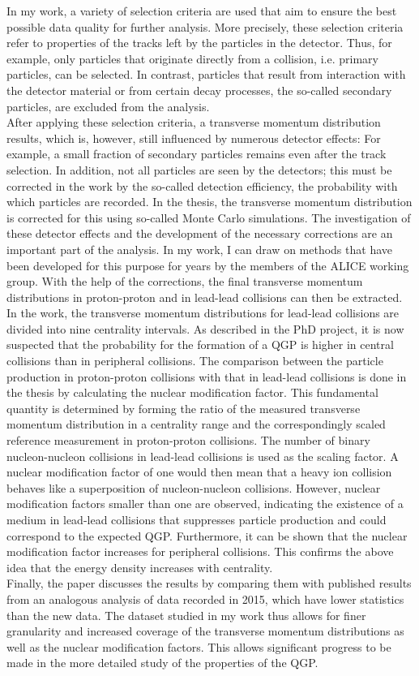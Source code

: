 \documentclass[12pt,a4paper]{report}
\begin{document}
In my work, a variety of selection criteria are used that aim to ensure the best possible data quality for further analysis. More precisely, these selection criteria refer to properties of the tracks left by the particles in the detector. Thus, for example, only particles that originate directly from a collision, i.e. primary particles, can be selected. In contrast, particles that result from interaction with the detector material or from certain decay processes, the so-called secondary particles, are excluded from the analysis.\\
After applying these selection criteria, a transverse momentum distribution results, which is, however, still influenced by numerous detector effects: For example, a small fraction of secondary particles remains even after the track selection. In addition, not all particles are seen by the detectors; this must be corrected in the work by the so-called detection efficiency, the probability with which particles are recorded. In the thesis, the transverse momentum distribution is corrected for this using so-called Monte Carlo simulations. The investigation of these detector effects and the development of the necessary corrections are an important part of the analysis. In my work, I can draw on methods that have been developed for this purpose for years by the members of the ALICE working group. With the help of the corrections, the final transverse momentum distributions in proton-proton and in lead-lead collisions can then be extracted. In the work, the transverse momentum distributions for lead-lead collisions are divided into nine centrality intervals. As described in the PhD project, it is now suspected that the probability for the formation of a QGP is higher in central collisions than in peripheral collisions. 
The comparison between the particle production in proton-proton collisions with that in lead-lead collisions is done in the thesis by calculating the nuclear modification factor. This fundamental quantity is determined by forming the ratio of the measured transverse momentum distribution in a centrality range and the correspondingly scaled reference measurement in proton-proton collisions. The number of binary nucleon-nucleon collisions in lead-lead collisions is used as the scaling factor. A nuclear modification factor of one would then mean that a heavy ion collision behaves like a superposition of nucleon-nucleon collisions. However, nuclear modification factors smaller than one are observed, indicating the existence of a medium in lead-lead collisions that suppresses particle production and could correspond to the expected QGP. Furthermore, it can be shown that the nuclear modification factor increases for peripheral collisions. This confirms the above idea that the energy density increases with centrality.\\
Finally, the paper discusses the results by comparing them with published results from an analogous analysis of data recorded in 2015, which have lower statistics than the new data. The dataset studied in my work thus allows for finer granularity and increased coverage of the transverse momentum distributions as well as the nuclear modification factors. This allows significant progress to be made in the more detailed study of the properties of the QGP.
\end{document}
